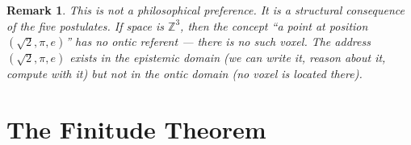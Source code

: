 \documentclass[11pt]{article}
\theoremstyle{tight}
\theoremstyle{plainroman}
\newtheorem{remark}[theorem]{Remark}
\newcommand{\Z}{\mathbb{Z}}
\begin{document}
\begin{remark}
This is not a philosophical preference.
It is a structural consequence of the five postulates.
If space is $\Z^3$, then the concept ``a point at position $(\sqrt{2},\pi,e)$'' has no ontic referent --- there is no such voxel.
The address $(\sqrt{2},\pi,e)$ exists in the epistemic domain (we can write it, reason about it, compute with it) but not in the ontic domain (no voxel is located there).
\end{remark}

\section{The Finitude Theorem}
\end{document}
